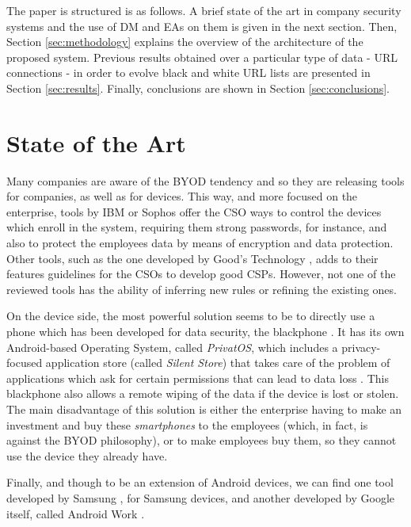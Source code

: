 \documentclass{sig-alternate}
\begin{document}
The paper is structured is as follows. A brief state of the art in company security systems and the use of DM and EAs on them is given in the next section. Then, Section \ref{sec:methodology} explains the overview of the architecture of the proposed system. Previous results obtained over a particular type of data - URL connections - in order to evolve black and white URL lists are presented in Section \ref{sec:results}. Finally, conclusions are shown in Section \ref{sec:conclusions}.

%
%
\section{State of the Art}
\label{sec:sota}

Many companies are aware of the BYOD tendency and so they are releasing tools for companies, as well as for devices. This way, and more focused on the enterprise, tools by IBM \cite{IBM_tool} or Sophos \cite{Sophos_tool} offer the CSO ways to control the devices which enroll in the system, requiring them strong passwords, for instance, and also to protect the employees data by means of encryption and data protection. Other tools, such as the one developed by Good's Technology \cite{Good_tool}, adds to their features guidelines for the CSOs to develop good CSPs. However, not one of the reviewed tools has the ability of inferring new rules or refining the existing ones.

On the device side, the most powerful solution seems to be to directly use a phone which has been developed for data security, the blackphone \cite{Blackphone_site}. It has its own Android-based Operating System, called \textit{PrivatOS}, which includes a privacy-focused application store (called \textit{Silent Store}) that takes care of the problem of applications which ask for certain permissions that can lead to data loss \cite{gangula2013survey}. This blackphone also allows a remote wiping of the data if the device is lost or stolen. The main disadvantage of this solution is either the enterprise having to make an investment and buy these \textit{smartphones} to the employees (which, in fact, is against the BYOD philosophy), or to make employees buy them, so they cannot use the device they already have.

Finally, and though to be an extension of Android devices, we can find one tool developed by Samsung \cite{Samsung_tool}, for Samsung devices, and another developed by Google itself, called Android Work \cite{AndroidWork_site}.
\end{document}
